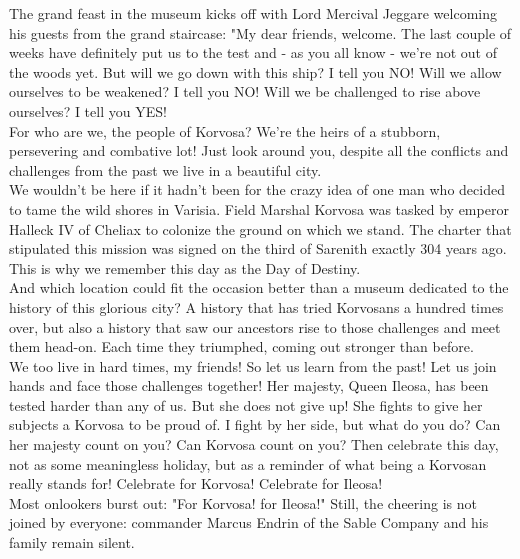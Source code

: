 The grand feast in the museum kicks off with Lord Mercival Jeggare welcoming his guests from the grand staircase: "My dear friends, welcome. The last couple of weeks have definitely put us to the test and - as you all know - we're not out of the woods yet. But will we go down with this ship? I tell you NO! Will we allow ourselves to be weakened? I tell you NO! Will we be challenged to rise above ourselves? I tell you YES!\\

For who are we, the people of Korvosa? We're the heirs of a stubborn, persevering and combative lot! Just look around you, despite all the conflicts and challenges from the past we live in a beautiful city.\\

We wouldn't be here if it hadn't been for the crazy idea of one man who decided to tame the wild shores in Varisia. Field Marshal Korvosa was tasked by emperor Halleck IV of Cheliax to colonize the ground on which we stand. The charter that stipulated this mission was signed on the third of Sarenith exactly 304 years ago. This is why we remember this day as the Day of Destiny.\\

And which location could fit the occasion better than a museum dedicated to the history of this glorious city? A history that has tried Korvosans a hundred times over, but also a history that saw our ancestors rise to those challenges and meet them head-on. Each time they triumphed, coming out stronger than before.\\

We too live in hard times, my friends! So let us learn from the past! Let us join hands and face those challenges together! Her majesty, Queen Ileosa, has been tested harder than any of us. But she does not give up! She fights to give her subjects a Korvosa to be proud of. I fight by her side, but what do you do? Can her majesty count on you? Can Korvosa count on you? Then celebrate this day, not as some meaningless holiday, but as a reminder of what being a Korvosan really stands for! Celebrate for Korvosa! Celebrate for Ileosa!\\

Most onlookers burst out: "For Korvosa! for Ileosa!" Still, the cheering is not joined by everyone: commander Marcus Endrin of the Sable Company and his family remain silent.\\

